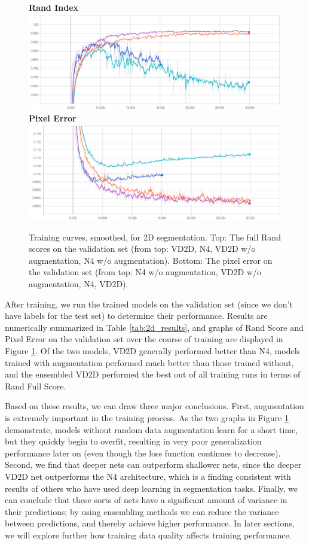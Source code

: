 \begin{figure}
\centering
\textbf{Rand Index}
\includegraphics[width=\textwidth]{img/2d_rand.png} \\
\textbf{Pixel Error}
\includegraphics[width=\textwidth]{img/2d_pixel.png}

\caption[Training curves for 2D segmentation]{Training curves, smoothed, for 2D segmentation. Top: The full Rand scores on the validation set (from top: VD2D, N4, VD2D w/o augmentation, N4 w/o augmentation). Bottom: The pixel error on the validation set (from top: N4 w/o augmentation, VD2D w/o augmentation, N4, VD2D).}
\label{fig:2d_training_curves}

\end{figure}

After training, we run the trained models on the validation set (since we don't have labels for the test set) to determine their performance. Results are numerically summarized in Table \ref{tab:2d_results}, and graphs of Rand Score and Pixel Error on the validation set over the course of training are displayed in Figure \ref{fig:2d_training_curves}. Of the two models, VD2D generally performed better than N4, models trained with augmentation performed much better than those trained without, and the ensembled VD2D performed the best out of all training runs in terms of Rand Full Score.

Based on these results, we can draw three major conclusions. First, augmentation is extremely important in the training process. As the two graphs in Figure \ref{fig:2d_training_curves} demonstrate, models without random data augmentation learn for a short time, but they quickly begin to overfit, resulting in very poor generalization performance later on (even though the loss function continues to decrease). Second, we find that deeper nets can outperform shallower nets, since the deeper VD2D net outperforms the N4 architecture, which is a finding consistent with results of others who have used deep learning in segmentation tasks. Finally, we can conclude that these sorts of nets have a significant amount of variance in their predictions; by using ensembling methods we can reduce the variance between predictions, and thereby achieve higher performance. In later sections, we will explore further how training data quality affects training performance.